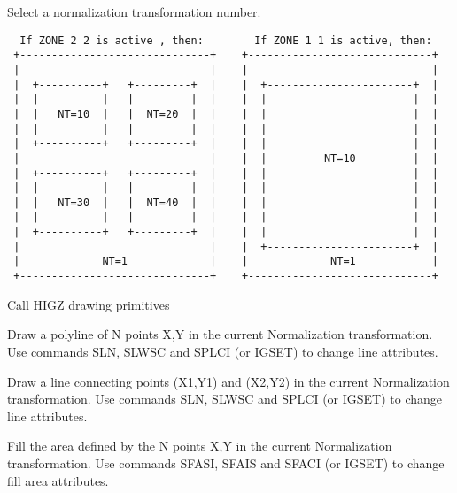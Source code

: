 \BEGARG
{}
\ENDARG
\BEGTEXT
Select a normalization transformation number.
\begin{verbatim}
  If ZONE 2 2 is active , then:        If ZONE 1 1 is active, then:
 +------------------------------+    +-----------------------------+
 |                              |    |                             |
 |  +----------+   +---------+  |    |  +-----------------------+  |
 |  |          |   |         |  |    |  |                       |  |
 |  |   NT=10  |   |  NT=20  |  |    |  |                       |  |
 |  |          |   |         |  |    |  |                       |  |
 |  +----------+   +---------+  |    |  |                       |  |
 |                              |    |  |         NT=10         |  |
 |  +----------+   +---------+  |    |  |                       |  |
 |  |          |   |         |  |    |  |                       |  |
 |  |   NT=30  |   |  NT=40  |  |    |  |                       |  |
 |  |          |   |         |  |    |  |                       |  |
 |  +----------+   +---------+  |    |  |                       |  |
 |                              |    |  +-----------------------+  |
 |             NT=1             |    |             NT=1            |
 +------------------------------+    +-----------------------------+
\end{verbatim}
\ENDTEXT


\BEGTEXT
Call HIGZ drawing primitives
\ENDTEXT

\BEGARG
{}
\ENDARG
\BEGTEXT
Draw a polyline of N points X,Y
in the current Normalization transformation.
Use commands SLN, SLWSC and SPLCI (or IGSET) to change line attributes.
\ENDTEXT

\BEGARG
{}
\ENDARG
\BEGTEXT
Draw a line connecting points (X1,Y1) and (X2,Y2)
in the current Normalization transformation.
Use commands SLN, SLWSC and SPLCI (or IGSET) to change line attributes.
\ENDTEXT

\BEGARG
{}
\ENDARG
\BEGTEXT
Fill the area defined by the N points X,Y
in the current Normalization transformation.
Use commands SFASI, SFAIS and SFACI (or IGSET) to change fill area attributes.
\ENDTEXT

